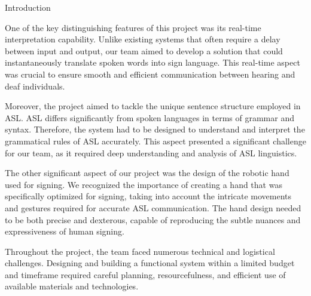 \documentclass[final, 20pt]{beamer}
\newlength{\colwidth}
\newlength{\twocolwidth}
\begin{document}
\begin{frame}[t]
\begin{columns}[t]
    \separatorcolumn

    \begin{column}{\twocolwidth}
      \begin{block}{Introduction}
        \begin{multicols}{2}


          One of the key distinguishing features of this project was its real-time interpretation capability. Unlike existing systems that often require a delay between input and output, our team aimed to develop a solution that could instantaneously translate spoken words into sign language. This real-time aspect was crucial to ensure smooth and efficient communication between hearing and deaf individuals.

          Moreover, the project aimed to tackle the unique sentence structure employed in ASL. ASL differs significantly from spoken languages in terms of grammar and syntax. Therefore, the system had to be designed to understand and interpret the grammatical rules of ASL accurately. This aspect presented a significant challenge for our team, as it required deep understanding and analysis of ASL linguistics.

          The other significant aspect of our project was the design of the robotic hand used for signing. We recognized the importance of creating a hand that was specifically optimized for signing, taking into account the intricate movements and gestures required for accurate ASL communication. The hand design needed to be both precise and dexterous, capable of reproducing the subtle nuances and expressiveness of human signing.

          Throughout the project, the team faced numerous technical and logistical challenges. Designing and building a functional system within a limited budget and timeframe required careful planning, resourcefulness, and efficient use of available materials and technologies.



\end{multicols}
\end{block}
\end{column}
\end{columns}
\end{frame}
\end{document}
